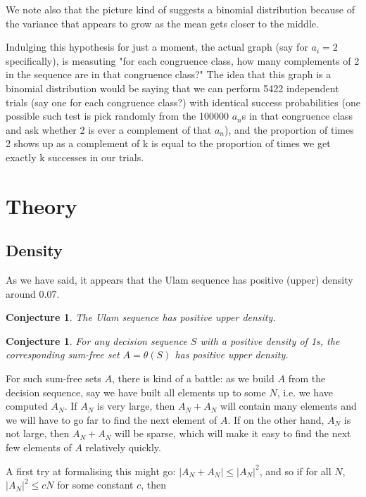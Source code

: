 \documentclass{article}
\newtheorem{conjecture}[theorem]{Conjecture}
\theoremstyle{definition}
\theoremstyle{remark}
\numberwithin{equation}{section}
\begin{document}
We note also that the picture kind of suggests a binomial distribution
because of the variance that appears to grow as the mean gets closer
to the middle.

Indulging this hypothesis for just a moment, the actual graph (say for
$a_i = 2$ specifically), is measuting "for each congruence class, how
many complements of 2 in the sequence are in that congruence class?"
The idea that this graph is a binomial distribution would be saying
that we can perform 5422 independent trials (say one for each
congruence class?)  with identical success probabilities (one possible
such test is pick randomly from the 100000 $a_n$s in that congruence
class and ask whether 2 is ever a complement of that $a_n$), and the
proportion of times 2 shows up as a complement of k is equal to the
proportion of times we get exactly k successes in our trials.


\section{Theory}

\subsection{Density}

As we have said, it appears that the Ulam sequence has positive
(upper) density around $0.07$.  

\begin{conjecture}
The Ulam sequence has positive upper density.
\end{conjecture}


\begin{conjecture}
  For any decision sequence $S$ with a positive density of 1s, the
  corresponding sum-free set $A = \theta(S)$ has positive upper density.
\end{conjecture}

For such sum-free sets $A$, there is kind of a battle: as we build $A$
from the decision sequence, say we have built all elements up to some
$N$, i.e. we have computed $A_N$.  If $A_N$ is very large, then
$A_N+A_N$ will contain many elements and we will have to go far to
find the next element of $A$.  If on the other hand, $A_N$ is not
large, then $A_N + A_N$ will be sparse, which will make it easy to
find the next few elements of $A$ relatively quickly.  

A first try at formalising this might go: $|A_N + A_N| \leq |A_N|^2$,
and so if for all $N$, $|A_N|^2 \leq cN$ for some constant $c$, then
\end{document}
